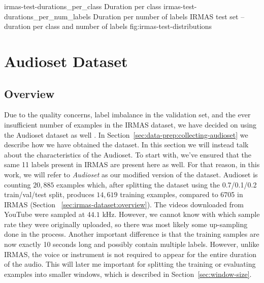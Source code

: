 \asideimages{7.3cm}{7.3cm}
	    {irmas-test-durations_per_class}
	    {Duration per class}
            {irmas-test-durations_per_num_labels}
	    {Duration per number of labels}
	    {IRMAS test set -- duration per class and number of labels}
	    {fig:irmas-test-distributions}


\section{Audioset Dataset}
\label{sec:audioset}

\subsection{Overview}
\label{sec:audioset:overview}
Due to the quality concerns, label imbalance in the validation set, and the ever insufficient number of examples in the IRMAS dataset, we have decided on using the Audioset dataset as well \cite{audioset2017}. In Section~\ref{sec:data-prep:collecting-audioset} we describe how we have obtained the dataset. In this section we will instead talk about the characteristics of the Audioset.
To start with, we've ensured that the same 11 labels present in IRMAS are present here as well. For that reason, in this work, we will refer to \textit{Audioset} as our modified version of the dataset.
Audioset is counting $20,885$ examples which, after splitting the dataset using the 0.7/0.1/0.2 train/val/test split, produces $14,619$ training examples, compared to 6705 in IRMAS (Section ~\ref{sec:irmas-dataset:overview}). The videos downloaded from YouTube were sampled at $44.1$ kHz. However, we cannot know with which sample rate they were originally uploaded, so there was most likely some up-sampling done in the process. Another important difference is that the training samples are now exactly 10 seconds long and possibly contain multiple labels. However, unlike IRMAS, the voice or instrument is not required to appear for the entire duration of the audio. This will later me important for splitting the training or evaluating examples into smaller windows, which is described in Section~\ref{sec:window-size}. 

